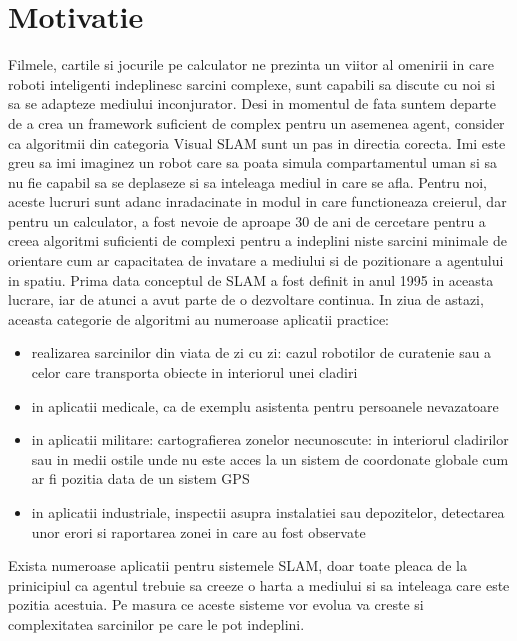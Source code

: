 \documentclass[12pt,a4paper]{report}
\begin{document}
\section{Motivatie}
Filmele, cartile si jocurile pe calculator ne prezinta un viitor al omenirii in care
roboti inteligenti indeplinesc sarcini complexe, sunt capabili sa discute cu noi si 
sa se adapteze mediului inconjurator. Desi in momentul de fata suntem departe de a
crea un framework suficient de complex pentru un asemenea agent, consider ca algoritmii din categoria 
Visual SLAM sunt un pas in directia corecta. Imi este greu sa imi imaginez un robot care
sa poata simula compartamentul uman si sa nu fie capabil sa se deplaseze si sa inteleaga mediul
in care se afla. Pentru noi, 
aceste lucruri sunt adanc inradacinate in modul in care functioneaza creierul, dar pentru
un calculator, a fost nevoie de aproape 30 de ani de cercetare pentru a creea algoritmi 
suficienti de complexi pentru a indeplini niste sarcini minimale de orientare cum ar 
capacitatea de invatare a mediului si de pozitionare a agentului in spatiu. Prima
data conceptul de SLAM a fost definit in anul 1995 in aceasta lucrare\cite{durrant1996slam}, 
iar de atunci a avut parte de o dezvoltare continua. In ziua de astazi, aceasta categorie 
de algoritmi au numeroase aplicatii practice: 
\begin{itemize}
    \item realizarea sarcinilor din viata de zi cu zi: cazul robotilor de curatenie
sau a celor care transporta obiecte in interiorul unei cladiri 
    \item in aplicatii medicale, ca de exemplu asistenta pentru persoanele nevazatoare
    \item in aplicatii militare: cartografierea zonelor necunoscute: in interiorul
cladirilor sau in medii ostile unde nu este acces la un sistem de coordonate globale
cum ar fi pozitia data de un sistem GPS  
    \item in aplicatii industriale, inspectii asupra instalatiei sau depozitelor, 
detectarea unor erori si raportarea zonei in care au fost observate    
\end{itemize}
Exista numeroase aplicatii pentru sistemele SLAM, doar toate pleaca de la prinicipiul 
ca agentul trebuie sa creeze o harta a mediului si sa inteleaga care este pozitia acestuia.
Pe masura ce aceste sisteme vor evolua va creste si complexitatea sarcinilor pe 
care le pot indeplini.   
\end{document}
